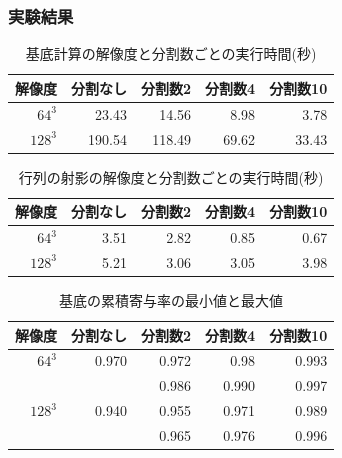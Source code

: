 \documentclass[aspectratio=169,dvipdfmx,hyperref={bookmarks=true}]{beamer}
\begin{document}
 \begin{frame}
 \frametitle{実験結果}
 \vspace{-35pt}
 \begin {table}[htbp]
    \centering
  \caption{基底計算の解像度と分割数ごとの実行時間(秒)}
  \label{tab:basis}
  \begin {tabular}{rrrrr} \hline
    \multicolumn{1}{c}{解像度} 					&\multicolumn{1}{c}{分割なし} 		&\multicolumn{1}{c}{分割数2}			&\multicolumn{1}{c}{分割数4} 		&\multicolumn{1}{c}{分割数10}\\ \hline
    $64^3$ 					& 23.43 			&14.56	 		&8.98	 	&3.78\\
    $128^3$ 				& 190.54 			&118.49 			& 69.62 		&33.43\\ \hline
  \end {tabular}
\end {table}

\begin {table}[htbp]
    \centering
  \caption{行列の射影の解像度と分割数ごとの実行時間(秒)}
  \label{tab:projection}
  \begin {tabular}{rrrrr} \hline
    \multicolumn{1}{c}{解像度} 					&\multicolumn{1}{c}{分割なし} 		&\multicolumn{1}{c}{分割数2}			&\multicolumn{1}{c}{分割数4} 		&\multicolumn{1}{c}{分割数10}\\ \hline
    $64^3$ 					& 3.51 			&2.82	 		&0.85	 		&0.67\\
    $128^3$ 				& 5.21 			& 3.06 			& 3.05 			&3.98\\ \hline
  \end {tabular}
\end {table}

\begin {table}[htbp]
    \centering
  \caption{基底の累積寄与率の最小値と最大値}
  \label{tab:ruiseki}
  \begin {tabular}{rrrrr} \hline
    \multicolumn{1}{c}{解像度} 					&\multicolumn{1}{c}{分割なし} 		&\multicolumn{1}{c}{分割数2}			&\multicolumn{1}{c}{分割数4} 		&\multicolumn{1}{c}{分割数10}\\ \hline
    $64^3$ 									& 0.970						& 0.972							&0.98		 				&0.993				\\
    										&							&0.986							&0.990						&0.997				\\ \hline
    $128^3$ 								&0.940 						&0.955							&0.971		 				&0.989				\\ 
    										&							&0.965							&0.976						&0.996				\\	\hline
  \end {tabular}
\end {table}
\end{frame}
\end{document}

